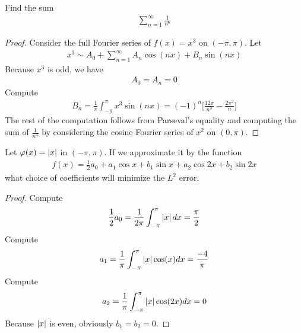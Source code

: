\documentclass{report}
\begin{document}
\begin{question}{}{}
Find the sum 
\begin{align*}
\sum_{n=1}^{\infty} \frac{1}{n^6}
\end{align*}
\end{question}
\begin{proof}
Consider the full Fourier series of $f(x)=x^3$ on $(-\pi ,\pi )$. Let 
\begin{align*}
x^3 \sim A_0+ \sum_{n=1}^{\infty} A_n \cos (nx)+ B_n \sin (nx)
\end{align*}
Because $x^3$ is odd, we have 
\begin{align*}
A_0=A_n=0
\end{align*}
Compute 
\begin{align*}
B_n= \frac{1}{\pi }\int_{-\pi }^{\pi } x^3\sin (nx)= (-1)^n \Big[\frac{12 \pi }{n^3}-\frac{2\pi ^2}{n}\Big]
\end{align*}
The rest of the computation follows from Parseval's equality and computing the sum of  $\frac{1}{n^4}$ by considering the cosine Fourier series of $x^2$ on $(0,\pi )$. 
\end{proof}
\begin{question}{}{}
Let $\varphi (x)=\left|x\right|$ in $(-\pi ,\pi )$. If we approximate it by the function 
\begin{align*}
f(x)= \frac{1}{2}a_0+ a_1\cos x + b_1 \sin x+ a_2 \cos 2x + b_2 \sin 2x
\end{align*}
what choice of coefficients will minimize the $L^2$ error. 
\end{question}
\begin{proof}
Compute 
\begin{align*}
\frac{1}{2}a_0= \frac{1}{2\pi }\int_{-\pi }^{\pi }\left|x\right|dx= \frac{\pi }{2}
\end{align*}
Compute 
\begin{align*}
a_1= \frac{1}{\pi } \int_{-\pi }^{\pi } \left|x\right|\cos (x)dx= \frac{-4}{\pi }
\end{align*}
Compute 
\begin{align*}
a_2=\frac{1}{\pi }\int_{-\pi }^{\pi }\left|x\right|\cos (2x)dx = 0
\end{align*}
Because $\left|x\right|$ is even, obviously $b_1=b_2=0$. 
\end{proof}
\end{document}

